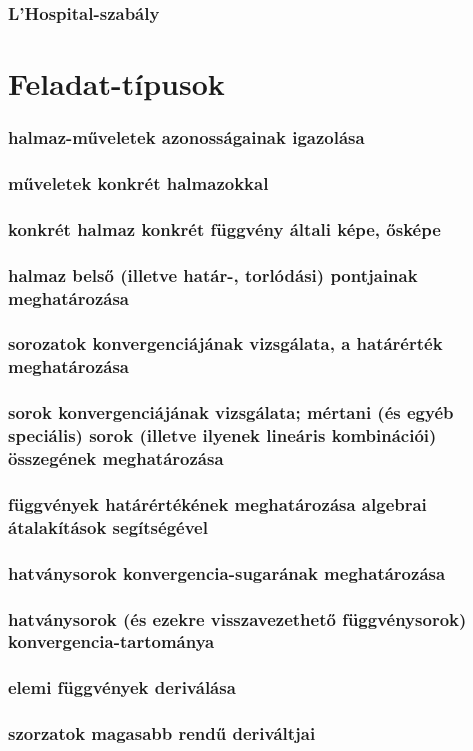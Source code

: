 \documentclass[12pt]{article}
\begin{document}
\subsubsection{L’Hospital-szabály}


\section{Feladat-típusok}

\subsubsection{halmaz-műveletek azonosságainak igazolása}
\subsubsection{műveletek konkrét halmazokkal}
\subsubsection{konkrét halmaz konkrét függvény általi képe, ősképe}
\subsubsection{halmaz belső (illetve határ-, torlódási) pontjainak meghatározása}
\subsubsection{sorozatok konvergenciájának vizsgálata, a határérték meghatározása}
\subsubsection{sorok konvergenciájának vizsgálata; mértani (és egyéb speciális) sorok (illetve
ilyenek lineáris kombinációi) összegének meghatározása}
\subsubsection{függvények határértékének meghatározása algebrai átalakítások segítségével}
\subsubsection{hatványsorok konvergencia-sugarának meghatározása}
\subsubsection{hatványsorok (és ezekre
visszavezethető függvénysorok) konvergencia-tartománya}
\subsubsection{elemi függvények deriválása}
\subsubsection{szorzatok magasabb rendű deriváltjai}
\end{document}
